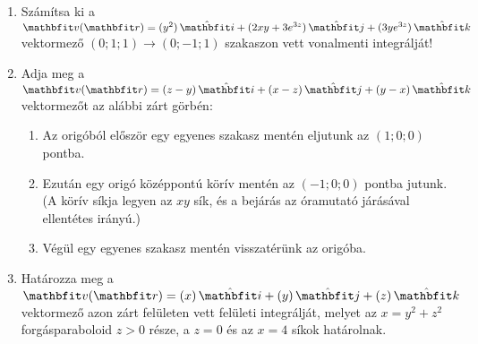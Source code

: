 \documentclass[fleqn]{szb-practice}
\begin{document}
\begin{enumerate}
  \item Számítsa ki a $\rvec v(\coordvec) = \ijk{y^2}{2xy + 3e^{3z}}{3ye^{3z}}$
        vektormező $(0; 1; 1) \to (0; -1; 1)$ szakaszon vett vonalmenti
        integrálját!

  \item Adja meg a $\rvec v(\coordvec) = \ijk{z - y}{x - z}{y - x}$ vektormezőt
        az alábbi zárt görbén:
        \begin{enumerate}
          \item Az origóból először egy egyenes szakasz mentén eljutunk az
                $(1;0;0)$ pontba.

          \item Ezután egy origó középpontú körív mentén az $(-1;0;0)$ pontba
                jutunk. (A körív síkja legyen az $x y$ sík, és a bejárás
                az óramutató járásával ellentétes irányú.)

          \item Végül egy egyenes szakasz mentén visszatérünk az origóba.
        \end{enumerate}

  \item Határozza meg a $\rvec v(\coordvec) = \ijk{x}{y}{z}$ vektormező
        azon zárt felületen vett felületi integrálját, melyet az
        $x = y^2 + z^2$ forgásparaboloid $z > 0$ része, a $z = 0$ és az
        $x = 4$ síkok határolnak.
\end{enumerate}
\end{document}
